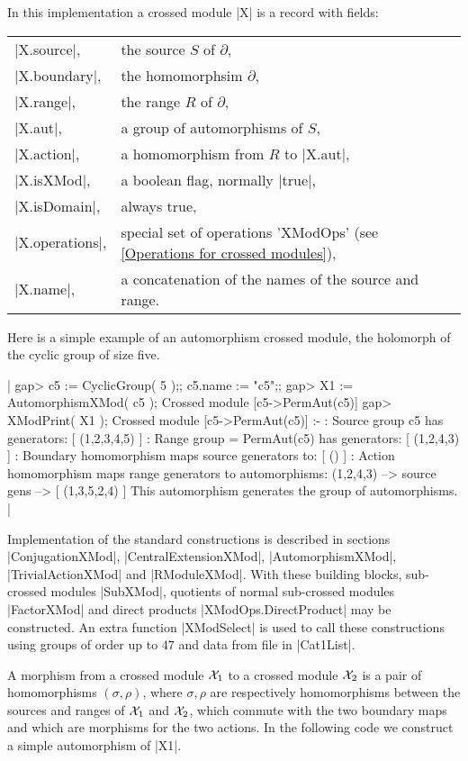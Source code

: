 In this implementation a crossed module  |X|  is a record with fields:

\begin{tabular}{ll}
|X.source|,     & the source $S$ of $\partial$,       \\
|X.boundary|,   & the homomorphsim $\partial$,        \\
|X.range|,      & the range $R$ of $\partial$,        \\
|X.aut|,        & a group of automorphisms of $S$,    \\
|X.action|,     & a homomorphism from $R$ to |X.aut|, \\
|X.isXMod|,     & a boolean flag, normally |true|,    \\
|X.isDomain|,   & always true,                        \\
|X.operations|, & special set of operations 'XModOps'
                  (see \ref{Operations for crossed modules}),  \\
|X.name|,       & a concatenation of the names of the source and range.
\end{tabular}

Here is a simple example of an automorphism crossed module, 
the holomorph of the cyclic group of size five.

|    gap> c5 := CyclicGroup( 5 );;   c5.name := "c5";;
    gap> X1 := AutomorphismXMod( c5 );
    Crossed module [c5->PermAut(c5)]
    gap> XModPrint( X1 );
    Crossed module [c5->PermAut(c5)] :- 
    : Source group c5 has generators:
      [ (1,2,3,4,5) ]
    : Range group = PermAut(c5) has generators:
      [ (1,2,4,3) ]
    : Boundary homomorphism maps source generators to:
      [ () ]
    : Action homomorphism maps range generators to automorphisms:
      (1,2,4,3) --> { source gens --> [ (1,3,5,2,4) ] }
      This automorphism generates the group of automorphisms.    |


Implementation of the standard constructions is described in sections
|ConjugationXMod|, |CentralExtensionXMod|, 
|AutomorphismXMod|, |TrivialActionXMod| and |RModuleXMod|.
With these building blocks, sub-crossed modules |SubXMod|,
quotients of normal sub-crossed modules |FactorXMod|
and direct products |XModOps.DirectProduct| may be constructed.
An extra function  |XModSelect|  is used to call these constructions
using groups of order up to $47$ and data from file in |Cat1List|.

A morphism from a crossed module ${\cal X}_1$ to a crossed module 
${\cal X}_2$  is a pair of homomorphisms  $(\sigma, \rho)$,  
where  $\sigma, \rho$
are respectively homomorphisms between the sources and ranges
of  ${\cal X}_1$  and  ${\cal X}_2$,  
which commute with the two boundary maps
and which are morphisms for the two actions.
In the following code we construct a simple automorphism of |X1|.

